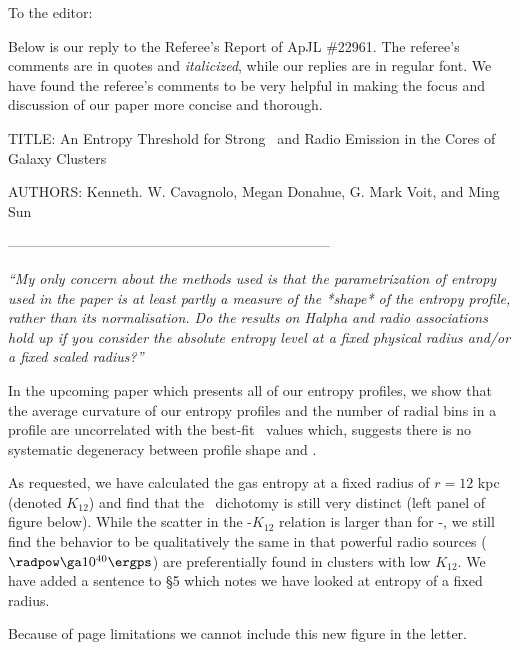 \documentclass[11pt]{article}
\begin{document}
To the editor:

Below is our reply to the Referee's Report of ApJL \#22961. The
referee's comments are in quotes and {\it{italicized}}, while our
replies are in regular font. We have found the referee's comments to
be very helpful in making the focus and discussion of our paper more
concise and thorough.

TITLE: An Entropy Threshold for Strong \halpha\ and Radio Emission in
the Cores of Galaxy Clusters

AUTHORS: Kenneth. W. Cavagnolo, Megan Donahue, G. Mark Voit, and Ming
Sun

---------------------------------------------------------------------

{\it{``My only concern about the methods used is that the
    parametrization of entropy used in the paper is at least partly a
    measure of the *shape* of the entropy profile, rather than its
    normalisation. Do the results on Halpha and radio associations
    hold up if you consider the absolute entropy level at a fixed
    physical radius and/or a fixed scaled radius?''}}

In the upcoming paper which presents all of our entropy profiles, we
show that the average curvature of our entropy profiles and the number
of radial bins in a profile are uncorrelated with the best-fit
\kna\ values which, suggests there is no systematic degeneracy between
profile shape and \kna.

As requested, we have calculated the gas entropy at a fixed radius of
$r=12$ kpc (denoted $K_{12}$) and find that the \halpha\ dichotomy is
still very distinct (left panel of figure below). While the scatter in
the \radpow-$K_{12}$ relation is larger than for \radpow-\kna, we
still find the behavior to be qualitatively the same in that powerful
radio sources ($\radpow \ga 10^{40} \ergps$) are preferentially found
in clusters with low $K_{12}$. We have added a sentence to \S5 which
notes we have looked at entropy of a fixed radius.

Because of page limitations we cannot include this new figure in the
letter.
\end{document}
